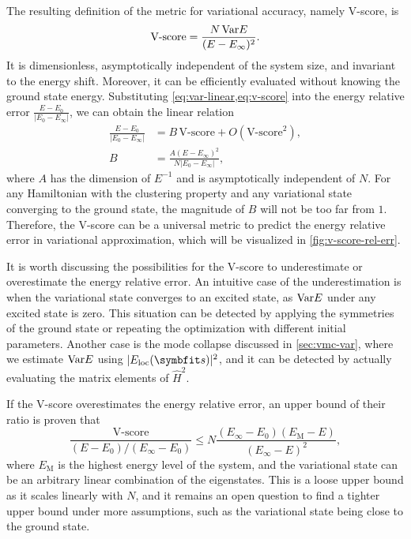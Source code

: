 The resulting definition of the metric for variational accuracy, namely V-score, is
\begin{equation}
\text{V-score} = \frac{N\,\mathrm{Var} E}{(E - E_\infty)^2}.
\label{eq:v-score}
\end{equation}
It is dimensionless, asymptotically independent of the system size, and invariant to the energy shift. Moreover, it can be efficiently evaluated without knowing the ground state energy. Substituting \cref{eq:var-linear,eq:v-score} into the energy relative error $\frac{E - E_0}{|E_0 - E_\infty|}$, we can obtain the linear relation
\begin{align}
\frac{E - E_0}{|E_0 - E_\infty|} &= B\,\text{V-score} + O(\text{V-score}^2), \label{eq:v-score-rel-err} \\
B &= \frac{A (E - E_\infty)^2}{N |E_0 - E_\infty|},
\end{align}
where $A$ has the dimension of $E^{-1}$ and is asymptotically independent of $N$. For any Hamiltonian with the clustering property and any variational state converging to the ground state, the magnitude of $B$ will not be too far from $1$. Therefore, the V-score can be a universal metric to predict the energy relative error in variational approximation, which will be visualized in \cref{fig:v-score-rel-err}.

It is worth discussing the possibilities for the V-score to underestimate or overestimate the energy relative error. An intuitive case of the underestimation is when the variational state converges to an excited state, as $\mathrm{Var} E$ under any excited state is zero. This situation can be detected by applying the symmetries of the ground state or repeating the optimization with different initial parameters. Another case is the mode collapse discussed in \cref{sec:vmc-var}, where we estimate $\mathrm{Var} E$ using $|E_\text{loc}(\vs)|^2$, and it can be detected by actually evaluating the matrix elements of $\hat{H}^2$.

If the V-score overestimates the energy relative error, an upper bound of their ratio is proven that
\begin{equation}
\frac{\text{V-score}}{(E - E_0) / (E_\infty - E_0)} \le N \frac{(E_\infty - E_0) (E_\text{M} - E)}{(E_\infty - E)^2},
\label{eq:v-score-bound}
\end{equation}
where $E_\text{M}$ is the highest energy level of the system, and the variational state can be an arbitrary linear combination of the eigenstates. This is a loose upper bound as it scales linearly with $N$, and it remains an open question to find a tighter upper bound under more assumptions, such as the variational state being close to the ground state.

